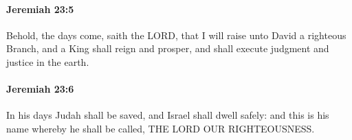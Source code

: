 		\paragraph{Jeremiah 23:5} %
			\label{JEREMIAH-23-5}

			Behold, the days come, saith the LORD, that I will raise unto David a righteous Branch, and a King shall reign and prosper, and shall execute judgment and justice in the earth.


		\paragraph{Jeremiah 23:6} %
			\label{JEREMIAH-23-6}

			In his days Judah shall be saved, and Israel shall dwell safely: and this is his name whereby he shall be called, THE LORD OUR RIGHTEOUSNESS.


